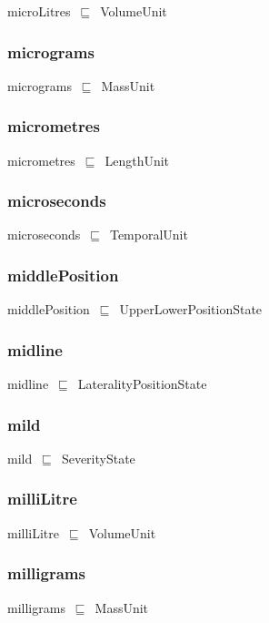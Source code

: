 \documentclass{article}
\begin{document}
microLitres~\ensuremath{\sqsubseteq}~VolumeUnit~

\subsubsection*{micrograms}

micrograms~\ensuremath{\sqsubseteq}~MassUnit~

\subsubsection*{micrometres}

micrometres~\ensuremath{\sqsubseteq}~LengthUnit~

\subsubsection*{microseconds}

microseconds~\ensuremath{\sqsubseteq}~TemporalUnit~

\subsubsection*{middlePosition}

middlePosition~\ensuremath{\sqsubseteq}~UpperLowerPositionState~

\subsubsection*{midline}

midline~\ensuremath{\sqsubseteq}~LateralityPositionState~

\subsubsection*{mild}

mild~\ensuremath{\sqsubseteq}~SeverityState~

\subsubsection*{milliLitre}

milliLitre~\ensuremath{\sqsubseteq}~VolumeUnit~

\subsubsection*{milligrams}

milligrams~\ensuremath{\sqsubseteq}~MassUnit~
\end{document}
